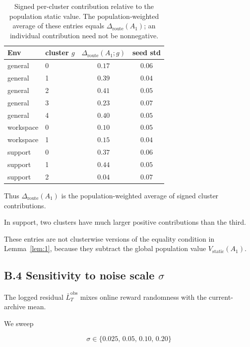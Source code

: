 \documentclass{article} %
\begin{document}
\begin{table}[h]
\centering
\footnotesize
\setlength{\tabcolsep}{4pt}
\begin{tabular}{llcc}
\toprule
Env & cluster $g$ & $\Delta_{\mathrm{route}}(A_1;g)$ & seed std \\
\midrule
general    & 0 & $0.17$ & $0.06$ \\
general    & 1 & $0.39$ & $0.04$ \\
general    & 2 & $0.41$ & $0.05$ \\
general    & 3 & $0.23$ & $0.07$ \\
general    & 4 & $0.40$ & $0.05$ \\
\midrule
workspace  & 0 & $0.10$ & $0.05$ \\
workspace  & 1 & $0.15$ & $0.04$ \\
\midrule
support    & 0 & $0.37$ & $0.06$ \\
support    & 1 & $0.44$ & $0.05$ \\
support    & 2 & $0.04$ & $0.07$ \\
\bottomrule
\end{tabular}
\caption{Signed per-cluster contribution relative to the population static
value. The population-weighted average of these entries equals
\(\Delta_{\mathrm{route}}(A_1)\); an individual contribution need not be
nonnegative.}
\label{tab:app-per-cluster}
\end{table}

Thus \(\Delta_{\mathrm{route}}(A_1)\) is the population-weighted average of
signed cluster contributions.

In support, two clusters have much larger positive contributions than the
third.

These entries are not clusterwise versions of the equality condition in
Lemma~\ref{lem:1}, because they subtract the global population value
\(V_{\mathrm{static}}(A_1)\).

\subsection{B.4 Sensitivity to noise scale $\sigma$}

\label{app:sigma-sweep}

The logged residual \(\bar L_T^{\mathrm{obs}}\) mixes online reward randomness
with the current-archive mean.

We sweep

\begin{equation}
\label{eq:app-sigma-grid}
\sigma \in \{0.025,\, 0.05,\, 0.10,\, 0.20\}
\end{equation}
\end{document}
